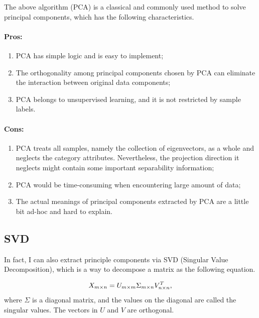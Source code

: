 \documentclass[12pt,a4paper]{article}
\theoremstyle{definition}
\begin{document}
The above algorithm (PCA) is a classical and commonly used method to solve principal components, which has the following characteristics.

\vspace{-0.012\linewidth}
\paragraph{Pros:}
\begin{enumerate}
	\item PCA has simple logic and is easy to implement;
	
	\item The orthogonality among principal components chosen by PCA can eliminate the interaction between original data components;
	
	\item PCA belongs to unsupervised learning, and it is not restricted by sample labels.
\end{enumerate}

\vspace{-0.03\linewidth}
\paragraph{Cons:}
\begin{enumerate}
	\item PCA treats all samples, namely the collection of eigenvectors, as a whole and neglects the category attributes. Nevertheless, the projection direction it neglects might contain some important separability information;
	
	\item PCA would be time-consuming when encountering large amount of data;
	
	\item The actual meanings of principal components extracted by PCA are a little bit ad-hoc and hard to explain.
\end{enumerate}

\subsection{SVD}
In fact, I can also extract principle components via SVD (Singular Value Decomposition), which is a way to decompose a matrix as the following equation. 

\begin{equation*}
	\centering
	X_{m \times n} = U_{m \times m} \Sigma_{m \times n} V^T_{n \times n},
\end{equation*}
where $\Sigma$ is a diagonal matrix, and the values on the diagonal are called the singular values. The vectors in $U$ and $V$ are orthogonal.
\end{document}
